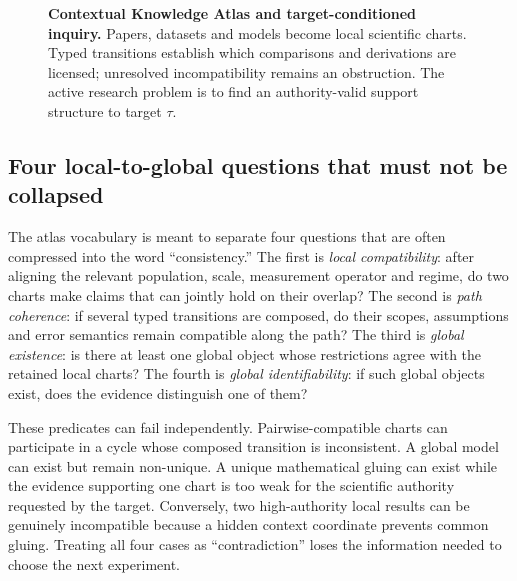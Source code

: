 \begin{figure}[t]
{}
\caption{\textbf{Contextual Knowledge Atlas and target-conditioned inquiry.} Papers, datasets and models become local scientific charts. Typed transitions establish which comparisons and derivations are licensed; unresolved incompatibility remains an obstruction. The active research problem is to find an authority-valid support structure to target $\tau$.}
\label{fig:atlas}
\end{figure}

\subsection{Four local-to-global questions that must not be collapsed}

The atlas vocabulary is meant to separate four questions that are often compressed into the word ``consistency.'' The first is \emph{local compatibility}: after aligning the relevant population, scale, measurement operator and regime, do two charts make claims that can jointly hold on their overlap? The second is \emph{path coherence}: if several typed transitions are composed, do their scopes, assumptions and error semantics remain compatible along the path? The third is \emph{global existence}: is there at least one global object whose restrictions agree with the retained local charts? The fourth is \emph{global identifiability}: if such global objects exist, does the evidence distinguish one of them?

These predicates can fail independently. Pairwise-compatible charts can participate in a cycle whose composed transition is inconsistent. A global model can exist but remain non-unique. A unique mathematical gluing can exist while the evidence supporting one chart is too weak for the scientific authority requested by the target. Conversely, two high-authority local results can be genuinely incompatible because a hidden context coordinate prevents common gluing. Treating all four cases as ``contradiction'' loses the information needed to choose the next experiment.

